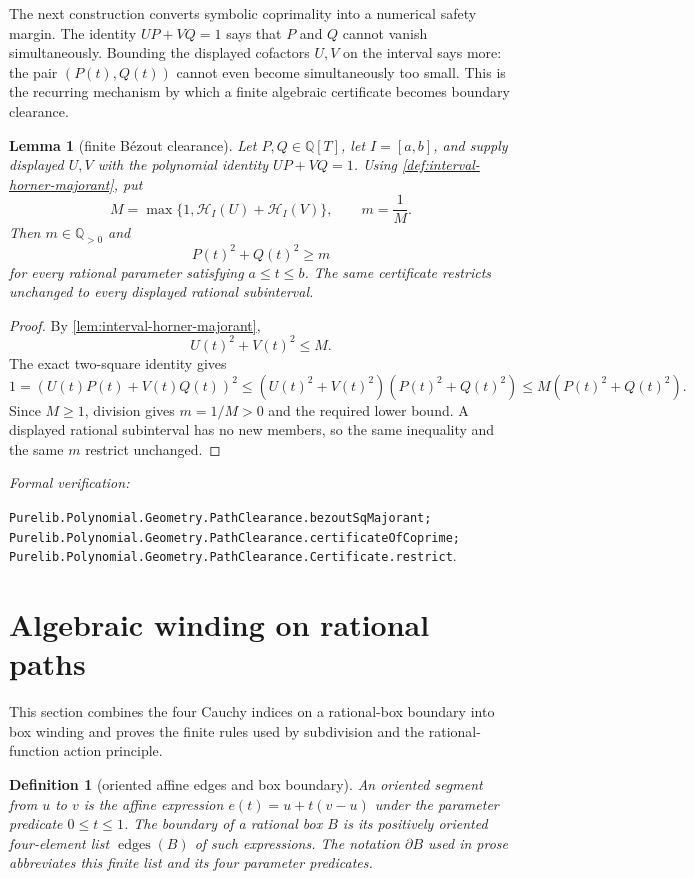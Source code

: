 \documentclass[11pt]{article}
\newtheorem{lemma}[theorem]{Lemma}
\newtheorem{definition}[theorem]{Definition}
\newcommand{\Q}{\mathbb{Q}}
\newcommand{\leanref}[1]{\par\smallskip\noindent
  \emph{Formal verification:}\par\nobreak
  {\raggedright\nolinkurl{#1}.\par}}
\begin{document}
The next construction converts symbolic coprimality into a numerical safety
margin.  The identity $UP+VQ=1$ says that $P$ and $Q$ cannot vanish
simultaneously.  Bounding the displayed cofactors $U,V$ on the interval says
more: the pair $(P(t),Q(t))$ cannot even become simultaneously too small.
This is the recurring mechanism by which a finite algebraic certificate
becomes boundary clearance.

\begin{lemma}[finite Bézout clearance]
\label{lem:positive-lower}
Let $P,Q\in\Q[T]$, let $I=[a,b]$, and supply displayed $U,V$ with the
polynomial identity $UP+VQ=1$.  Using
\cref{def:interval-horner-majorant}, put
\[
 M=\max\{1,\mathcal H_I(U)+\mathcal H_I(V)\},
 \qquad m=\frac1M.
\]
Then $m\in\Q_{>0}$ and
\[
             P(t)^2+Q(t)^2\ge m
\]
for every rational parameter satisfying $a\le t\le b$.  The same certificate
restricts unchanged to every displayed rational subinterval.
\end{lemma}

\begin{proof}
By \cref{lem:interval-horner-majorant},
\[
                  U(t)^2+V(t)^2\le M.
\]
The exact two-square identity gives
\[
 1=(U(t)P(t)+V(t)Q(t))^2
 \le (U(t)^2+V(t)^2)(P(t)^2+Q(t)^2)
 \le M(P(t)^2+Q(t)^2).
\]
Since $M\ge1$, division gives $m=1/M>0$ and the required lower bound.  A
displayed rational subinterval has no new members, so the same inequality
and the same $m$ restrict unchanged.
\end{proof}

\leanref{Purelib.Polynomial.Geometry.PathClearance.bezoutSqMajorant;
Purelib.Polynomial.Geometry.PathClearance.certificateOfCoprime;
Purelib.Polynomial.Geometry.PathClearance.Certificate.restrict}

\section{Algebraic winding on rational paths}
\label{sec:winding-realization}

This section combines the four Cauchy indices on a rational-box boundary
into box winding and proves the finite rules used by subdivision and the
rational-function action principle.

\begin{definition}[oriented affine edges and box boundary]
\label{def:oriented-box-boundary}
An oriented segment from $u$ to $v$ is the affine expression
$e(t)=u+t(v-u)$ under the parameter predicate $0\le t\le1$.  The boundary
of a rational box $B$ is its positively oriented four-element list
$\operatorname{edges}(B)$ of such expressions.  The notation $\partial B$
used in prose abbreviates this finite list and its four parameter predicates.
\end{definition}
\end{document}
